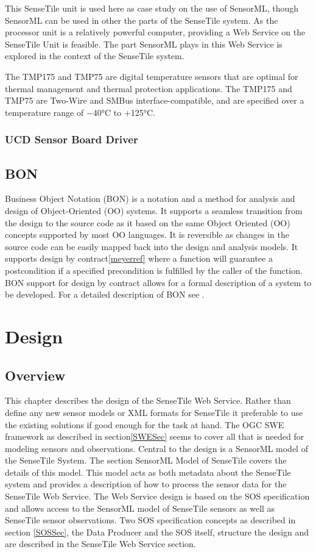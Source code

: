 \documentclass[]{final_report}
\begin{document}
This SenseTile unit is used here as case study on the use of SensorML, though SensorML can be used in other the parts of the SenseTile system. As the processor unit is a relatively powerful computer, providing a Web Service on the SenseTile Unit is feasible. The part SensorML plays in this Web Service is explored in the context of the SenseTile system.

The TMP175 and TMP75 are digital temperature sensors
that are optimal for thermal management and thermal
protection applications. The TMP175 and TMP75 are
Two-Wire and SMBus interface-compatible, and are
specified over a temperature range of −40°C to +125°C.

\subsection{UCD Sensor Board Driver}\label{SensorBoardDriverSec}





\section{BON} \label{BONsec}
Business Object Notation (BON) is a notation and a method for analysis and design of Object-Oriented (OO) systems. It supports a seamless transition from the design to the source code as it based on the same Object Oriented (OO) concepts supported by most OO languages. It is reversible as changes in the source code can be easily mapped back into the design and analysis models. It supports design by contract\ref{meyerref} where a function will guarantee a postcondition if a specified precondition is fulfilled by the caller of the function. BON support for design by contract allows for a formal description of a system to be developed. For a detailed description of BON see \cite{BONref}.
\chapter{Design}
\section{Overview}
This chapter describes the design of the SenseTile Web Service. Rather than define any new sensor models or XML formats for SenseTile it preferable to use the existing solutions if good enough for the task at hand. The OGC SWE framework as described in section\ref{SWESec} seems to cover all that is needed for modeling sensors and observations. Central to the design is a SensorML model of the SenseTile System. The section SensorML Model of SenseTile covers the details of this model. This model acts as both metadata about the SenseTile system and provides a description of how to process the sensor data for the SenseTile Web Service.
The Web Service design is based on the SOS specification and allows access to the SensorML model of SenseTile sensors as well as SenseTile sensor observations. Two SOS specification concepts as described in section \ref{SOSSec}, the Data Producer and the SOS itself, structure the design and are described in the SenseTile Web Service section.
\end{document}
